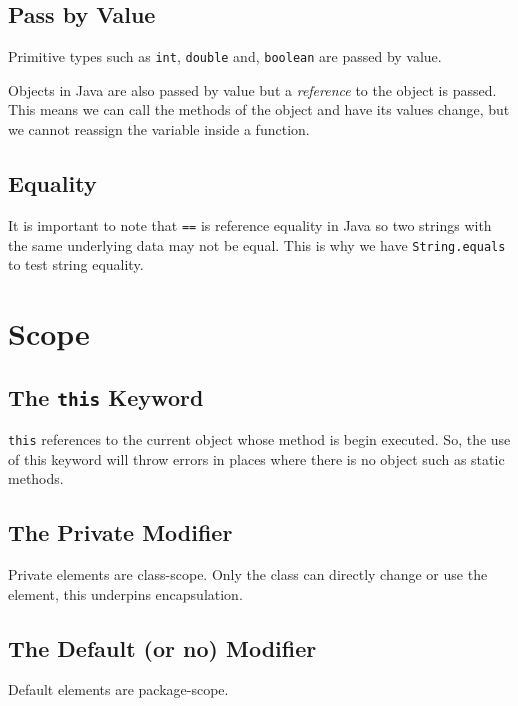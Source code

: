 \documentclass[a4paper, 12pt, twoside]{article}
\begin{document}
\subsection{Pass by Value}

Primitive types such as \texttt{int}, \texttt{double} and, 
\texttt{boolean} are passed by value.

\vspace{\baselineskip}

Objects in Java are also passed by value but a \textit{reference}
to the object is passed. This means we can call the methods of the
object and have its values change, but we cannot reassign the
variable inside a function.

\subsection{Equality}

It is important to note that \texttt{==} is reference equality
in Java so two strings with the same underlying data may not
be equal. This is why we have \texttt{String.equals} to test
string equality.

\newpage

\section{Scope}

\subsection{The \texttt{this} Keyword}

\texttt{this} references to the current object whose method
is begin executed. So, the use of this keyword will throw
errors in places where there is no object such as static methods.

\subsection{The Private Modifier}

Private elements are class-scope. Only the class can directly
change or use the element, this underpins encapsulation.

\subsection{The Default (or no) Modifier}

Default elements are package-scope.
\end{document}
